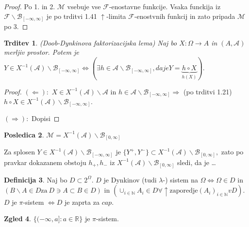 \documentclass[a4paper,12pt]{article}
\theoremstyle{definition} %
\newtheorem{definicija}{Definicija}[section]
\newtheorem{zgled}[definicija]{Zgled}
\theoremstyle{plain} %
\newtheorem{trditev}[definicija]{Trditev}
\newtheorem{posledica}[definicija]{Posledica}
\newcommand{\R}{\mathbb{R}}
\newcommand{\N}{\mathbb{N}}
\newcommand{\F}{\mathcal{F}}
\newcommand{\A}{\mathcal{A}}
\begin{document}
            \begin{proof}
                Po 1. in 2. $\mathcal{M}$ vsebuje vse $\F$-enostavne funkcije. Vsaka funckija iz $\F\backslash\mathcal{B}_{[-\infty, \infty]}$ je po trditvi 1.41 
                $\uparrow$-limita $\F$-enostvnih funkcij in zato pripada $\mathcal{M}$ po 3.
            \end{proof}

            \begin{trditev}
                (Doob-Dynkinova faktorizacijska lema)
                Naj bo $X:\Omega \rightarrow A$ in  $(A, \A)$ merljiv prostor. Potem je 
                $Y \in X^{-1}(\A)\backslash\mathcal{B}_{[-\infty, \infty]} \iff \left(\exists h \in \A\backslash\mathcal{B}_{[-\infty, \infty]}, da je Y = \underbrace{h \circ X}_{h(X)}\right).$  
            \end{trditev}

            \begin{proof}
                $(\Leftarrow):$ $X \in X^{-1}(\A)\backslash\A$ in $h \in \A\backslash\mathcal{B}_{[-\infty, \infty]} \Rightarrow$ (po trditvi 1.21) $h \circ X \in X^{-1}(\A)\backslash\mathcal{B}_{[-\infty, \infty]}.$

                $(\Rightarrow):$ Dopisi
            \end{proof}

            \begin{posledica}
                $\mathcal{M} = X^{-1}(\A)\backslash\mathcal{B}_{[0, \infty]}$
            \end{posledica}

            Za splosen $Y \in X^{-1}(\A)\backslash\mathcal{B}_{[-\infty, \infty]}$ je $\{Y^+, Y^-\} \subset X^{-1}(\A)\backslash\mathcal{B}_{[0, \infty]},$
            zato po pravkar dokazanem obstoju $h_+, h_-$ iz $X^{-1}(\A)\backslash\mathcal{B}_{[0, \infty]}$ sledi, da je \dots

            \begin{definicija}
                Naj bo $D \subset 2^\Omega.$ $D$ je Dynkinov (tudi $\lambda$-) sistem na $\Omega \iff \Omega \in D$ in $(B\backslash A \in D \text{za} \ D \ni A \subset B \in D)$ in
                $(\cup_{i \in \N}A_i \in D \forall \uparrow \text{zaporedje} (A_i)_{i \in \N} v D).$ $D$ je $\pi$-sistem $\iff D$ je zaprta za $cap$.

            \end{definicija}

            \begin{zgled}
                $\{(-\infty, a]: a \in \R\}$ je $\pi$-sistem.
            \end{zgled}
\end{document}
